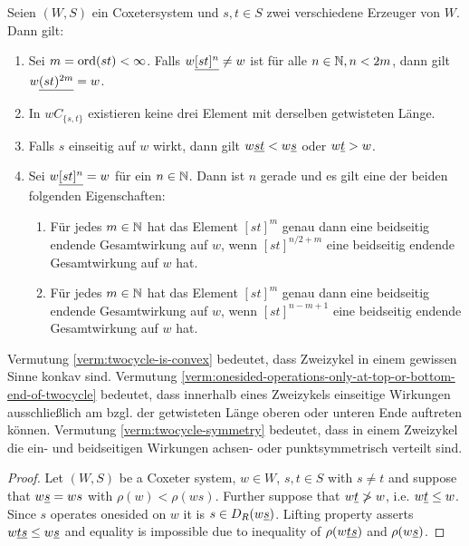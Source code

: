 \begin{verm}
Seien $(W,S)$ ein Coxetersystem und $s,t \in S$ zwei verschiedene Erzeuger
von $W$. Dann gilt:
\begin{enumerate}
  \item \label{verm:max-twocycle-length} Sei $m = \operatorname{ord} (st) < \infty$. Falls
  $w \underline{[st]^n} \neq w$ ist für alle $n \in \mathbb{N}, n < 2m$, dann gilt $w \underline{(st)^{2m}} = w$.
  \item \label{verm:twocycle-is-convex} In $wC_{\{s,t\}}$ existieren keine drei
  Element mit derselben getwisteten Länge.
  \item \label{verm:onesided-operations-only-at-top-or-bottom-end-of-twocycle}
  Falls $s$ einseitig auf $w$ wirkt, dann gilt $w \underline{st} < w \underline{s}$ oder $w
  \underline{t} > w$.
  \item \label{verm:twocycle-symmetry} Sei $w \underline{[st]^n} = w$ für ein $n \in
  \mathbb{N}$. Dann ist $n$ gerade und es gilt eine der beiden folgenden Eigenschaften:
  	\begin{enumerate}
  	  \item Für jedes $m \in \mathbb{N}$ hat das Element $[st]^m$ genau dann eine
  	  beidseitig endende Gesamtwirkung auf $w$, wenn $[st]^{n/2+m}$ eine beidseitig endende
  	  Gesamtwirkung auf $w$ hat.
  	  \item Für jedes $m \in \mathbb{N}$ hat das Element $[st]^m$ genau dann eine
  	  beidseitig endende Gesamtwirkung auf $w$, wenn $[st]^{n-m+1}$ eine beidseitig endende
  	  Gesamtwirkung auf $w$ hat.
  	\end{enumerate}
\end{enumerate}
\end{verm}

\begin{anm}
	Vermutung \ref{verm:twocycle-is-convex} bedeutet, dass Zweizykel in einem
	gewissen Sinne konkav sind. Vermutung
	\ref{verm:onesided-operations-only-at-top-or-bottom-end-of-twocycle} bedeutet,
	dass innerhalb eines Zweizykels einseitige Wirkungen ausschließlich am
	bzgl. der getwisteten Länge oberen oder unteren Ende auftreten können.
	Vermutung \ref{verm:twocycle-symmetry} bedeutet, dass in einem Zweizykel die
	ein- und beidseitigen Wirkungen achsen- oder punktsymmetrisch verteilt sind.
\end{anm}

\begin{lemm}
\begin{proof}
Let $(W,S)$ be a Coxeter system, $w \in W$, $s, t \in S$ with $s \neq t$ and
suppose that $w \underline{s} = ws$ with $\rho(w) < \rho(ws)$. Further suppose that $w
\underline{t} \not > w$, i.e.
$w \underline{t} \leq w$. Since $s$ operates onesided on $w$ it is $s \in D_R(w \underline{s})$.
Lifting property \cite[Proposition 3.10]{hultman:comb-twisted-invo} asserts $w
\underline{ts} \leq w \underline{s}$ and equality is impossible due to inequality of $\rho(w
\underline{ts})$ and $\rho(w \underline{s})$.
\end{proof}
\end{lemm}